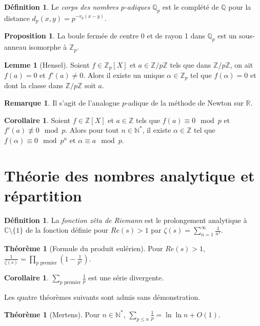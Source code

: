\documentclass[a5paper, 10pt]{article}
\theoremstyle{definition}
\newtheorem{definition}[equation]{Définition}
\newtheorem{proposition}[equation]{Proposition}
\newtheorem{theorem}[equation]{Théorème}
\newtheorem{lemma}[equation]{Lemme}
\newtheorem{remark}[equation]{Remarque}
\newtheorem{corollary}[equation]{Corollaire}
\newcounter{n}
\def\Z{\mathbb{Z}}
\def\N{\mathbb{N}}
\def\Q{\mathbb{Q}}
\def\R{\mathbb{R}}
\def\C{\mathbb{C}}
\begin{document}
\begin{definition}
  Le \emph{corps des nombres $p$-adiques} $\Q_p$ est le complété de
  $\Q$ pour la distance $d_p(x,y) = p^{-v_p(x-y)}$.
\end{definition}
\begin{proposition}
  La boule fermée de centre 0 et de rayon 1 dans $\Q_p$ est un
  sous-anneau isomorphe à $\Z_p$.
\end{proposition}

\begin{lemma}[Hensel]
  Soient $f \in \Z_p[X]$ et $a \in \Z/p\Z$ tels que dans $\Z/p\Z$, on
  ait $f(a) = 0$ et $f'(a) \neq 0$. Alors il existe un unique
  $\alpha \in \Z_p$ tel que $f(\alpha) = 0$ et dont la classe dans
  $\Z/p\Z$ soit $a$.
\end{lemma}
\begin{remark}
  Il s'agit de l'analogue $p$-adique de la méthode de Newton sur $\R$.
\end{remark}
\begin{corollary}
  Soient $f \in \Z[X]$ et $a \in \Z$ tels que $f(a) \equiv 0 \mod p$
  et $f'(a) \not\equiv 0 \mod p$. Alors pour tout $n \in \N^*$, il
  existe $\alpha \in \Z$ tel que $f(\alpha) \equiv 0 \mod p^n$ et
  $\alpha \equiv a \mod p$.
\end{corollary}

\section{Théorie des nombres analytique et répartition}

\begin{definition}
  La \emph{fonction zêta de Riemann} est le prolongement analytique à
  $\C \setminus \{1\}$ de la fonction définie pour $Re(s) > 1$ par
$\displaystyle \zeta(s) = \sum_{n=1}^\infty \frac{1}{n^s}$.
\end{definition}
\begin{theorem}[Formule du produit eulérien]
  Pour $Re(s) > 1$,
  $\displaystyle \frac{1}{\zeta(s)} = \prod_{\text{\(p\) premier}} \left(1 - \frac{1}{p^s}\right)$.
\end{theorem}
\begin{corollary}
  $\displaystyle \sum_{\text{\(p\) premier}} \frac{1}{p}$ est une série divergente.
\end{corollary}

Les quatre théorèmes suivants sont admis sans démonstration.

\begin{theorem}[Mertens]
  Pour $n \in \N^*$, $\displaystyle \sum_{p \leq n} \frac{1}{p} = \ln \ln n + O(1)$.
\end{theorem}
\end{document}
